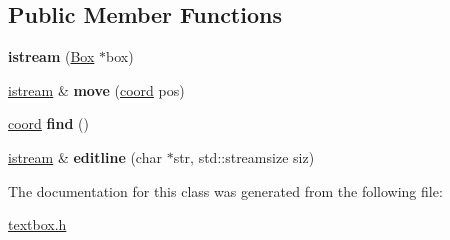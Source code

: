 \subsection*{Public Member Functions}
\begin{DoxyCompactItemize}
\item 
\mbox{\label{a00028_ae5080239d7ee3af9b44560f93ae27bb2}} 
{\bfseries istream} (\hyperlink{a00032}{Box} $\ast$box)
\item 
\mbox{\label{a00028_ad447d78602bdb69cd6506de8743cc014}} 
\hyperlink{a00028}{istream} \& {\bfseries move} (\hyperlink{a00016}{coord} pos)
\item 
\mbox{\label{a00028_ab7b3c484d049f7827462a35cca79c62c}} 
\hyperlink{a00016}{coord} {\bfseries find} ()
\item 
\mbox{\label{a00028_af72da4d27ba8c504d9ee2e6ceab90056}} 
\hyperlink{a00028}{istream} \& {\bfseries editline} (char $\ast$str, std\+::streamsize siz)
\end{DoxyCompactItemize}


The documentation for this class was generated from the following file\+:\begin{DoxyCompactItemize}
\item 
\hyperlink{a00005}{textbox.\+h}\end{DoxyCompactItemize}
